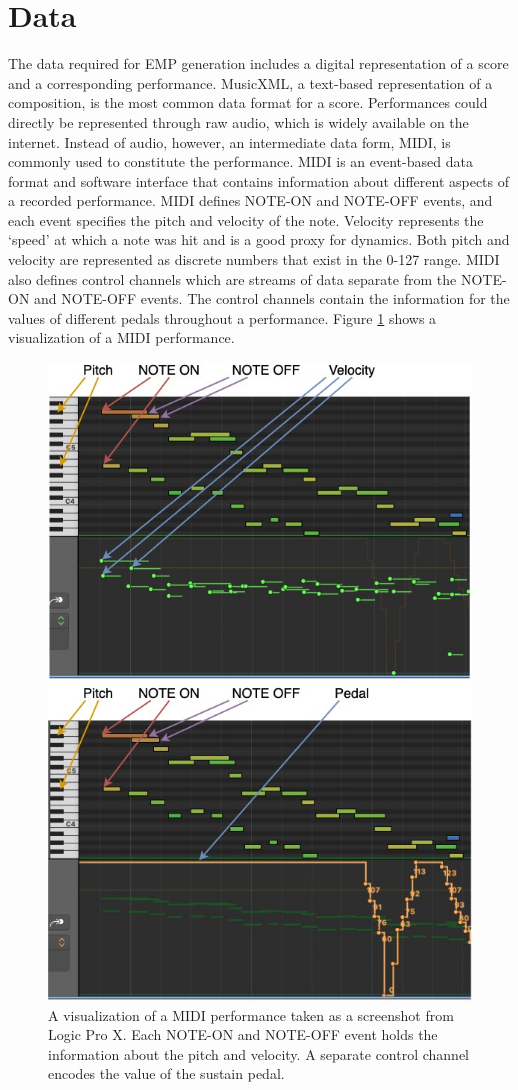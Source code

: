 \section{Data}
The data required for EMP generation includes a digital representation of a score and a corresponding performance. MusicXML, a text-based representation of a composition, is the most common data format for a score. Performances could directly be represented through raw audio, which is widely available on the internet. Instead of audio, however, an intermediate data form, MIDI, is commonly used to constitute the performance. MIDI is an event-based data format and software interface that contains information about different aspects of a recorded performance. MIDI defines NOTE-ON and NOTE-OFF events, and each event specifies the pitch and velocity of the note. Velocity represents the `speed' at which a note was hit and is a good proxy for dynamics. Both pitch and velocity are represented as discrete numbers that exist in the 0-127 range. MIDI also defines control channels which are streams of data separate from the NOTE-ON and NOTE-OFF events. The control channels contain the information for the values of different pedals throughout a performance. Figure \ref{fig:midi} shows a visualization of a MIDI performance. 

\begin{figure}[ht!]
    \centering
    \includegraphics[width=0.6\linewidth]{figs/ch2/midi.jpg}
    \caption{A visualization of a MIDI performance taken as a screenshot from Logic Pro X. Each NOTE-ON and NOTE-OFF event holds the information about the pitch and velocity. A separate control channel encodes the value of the sustain pedal.}
    \label{fig:midi}
\end{figure}

